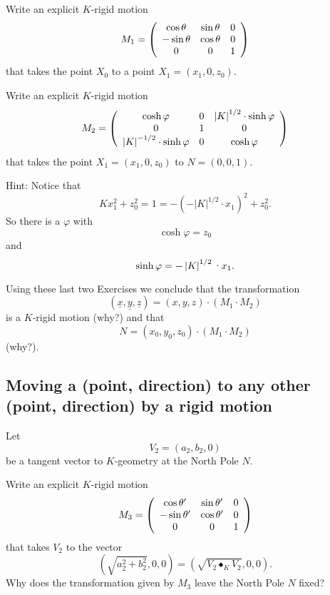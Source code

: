 \documentclass{ximera}
\begin{document}
\begin{exercise}
 Write an explicit $K$-rigid motion%
\[
M_{1}=\left(
\begin{array}
[c]{ccc}%
\cos \theta & \sin \theta & 0\\
-\sin \theta & \cos \theta & 0\\
0 & 0 & 1
\end{array}
\right)
\]
that takes the point $X_{0}$ to a point $X_{1}=\left(  x_{1},0,z_{0}\right)  $.
\end{exercise}

\begin{exercise}
 Write an explicit $K$-rigid motion%
\[
M_{2}=\left(
\begin{array}
[c]{ccc}%
\cosh \varphi & 0 & \left\vert K\right\vert ^{1/2}%
\cdot\sinh \varphi\\
0 & 1 & 0\\
\left\vert K\right\vert ^{-1/2}\cdot\sinh \varphi
& 0 & \cosh \varphi
\end{array}
\right)
\]
that takes the point $X_{1}=\left(  x_{1},0,z_{0}\right)  $ to $N=\left(
0,0,1\right)  $.

Hint: Notice that%
\[
Kx_{1}^{2}+z_{0}^{2}=1=-\left(  -\left\vert K\right\vert ^{1/2}%
\cdot x_{1}\right)  ^{2}+z_{0}^{2}.
\]
So there is a $\varphi$ with
\[
\cosh \varphi=z_{0}%
\]
and%
\[
\sinh \varphi=-\left\vert K\right\vert ^{1/2}\text{\textperiodcentered
}x_{1}.
\]

\end{exercise}

Using these last two Exercises we conclude that the transformation%
\[
\left(  \underline{x},\underline{y},\underline{z}\right)  =\left(
x,y,z\right)  \cdot\left(  M_{1}\cdot M_{2}\right)
\]
is a $K$-rigid motion (why?) and that%
\[
N=\left(  x_{0},y_{0},z_{0}\right)  \cdot\left(  M_{1}\cdot M_{2}\right)
\]
(why?).



\subsection*{Moving a (point, direction) to any other (point, direction) by a
rigid motion}

Let
\[
V_{2}=\left(  a_{2},b_{2},0\right)
\]
be a tangent vector to $K$-geometry at the North Pole $N$.

\begin{exercise}
 Write an explicit $K$-rigid motion%
\[
M_{3}=\left(
\begin{array}
[c]{ccc}%
\cos \theta^{\prime} & \sin \theta^{\prime} & 0\\
-\sin \theta^{\prime} & \cos \theta^{\prime} & 0\\
0 & 0 & 1
\end{array}
\right)
\]
that takes $V_{2}$ to the vector%
\[
\left(  \sqrt{a_{2}^{2}+b_{2}^{2}},0,0\right)  =\left(  \sqrt{V_{2}\bullet
_{K}V_{2}},0,0\right)  .
\]
Why does the transformation given by $M_{3}$ leave the North Pole $N$ fixed?
\end{exercise}
\end{document}
